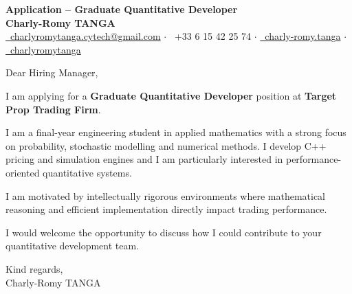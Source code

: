 \documentclass[10pt, letterpaper]{article}
\newcommand{\targetCompany}{Target Prop Trading Firm}
\newcommand{\targetRole}{Graduate Quantitative Developer}
\begin{document}
\begin{center}
    \textbf{\LARGE Application -- \targetRole{}} \\[0.2cm]
    \textbf{\large Charly-Romy TANGA} \\[0.2cm]
    \href{mailto:charlyromytanga.cytech@gmail.com}{\faEnvelope\ charlyromytanga.cytech@gmail.com}
    \quad$\cdot$\quad
    \faPhone\ +33 6 15 42 25 74
    \quad$\cdot$\quad
    \href{https://www.linkedin.com/in/charly-romy-tanga}{\faLinkedin\ charly-romy.tanga}
    \quad$\cdot$\quad
    \href{https://github.com/charlyromytanga}{\faGithub\ charlyromytanga}
\end{center}

Dear Hiring Manager,

I am applying for a \textbf{\targetRole{}} position at \textbf{\targetCompany{}}.

I am a final-year engineering student in applied mathematics with a strong focus on probability, stochastic modelling and numerical methods. I develop C++ pricing and simulation engines and I am particularly interested in performance-oriented quantitative systems.

I am motivated by intellectually rigorous environments where mathematical reasoning and efficient implementation directly impact trading performance.

I would welcome the opportunity to discuss how I could contribute to your quantitative development team.

Kind regards,\\
Charly-Romy TANGA
\end{document}
